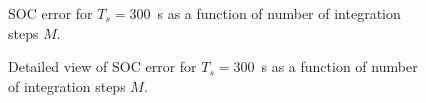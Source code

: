 \documentclass[../zhang_thesis.tex]{subfiles}
\begin{document}
\clearpage

\begin{figure}[p]
\centering

\caption{SOC error for $T_s=300$~s as a function of number of integration steps $M$.}
\label{fig:mrmse_300}
\end{figure}

\begin{figure}[p]
\centering

\caption{Detailed view of SOC error for $T_s=300$~s as a function of number of integration steps $M$.}
\label{fig:mrmse_det_300}
\end{figure}
\end{document}
